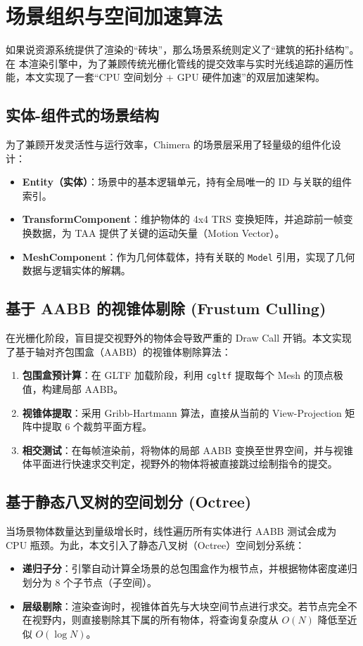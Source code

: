 \section{场景组织与空间加速算法}

如果说资源系统提供了渲染的“砖块”，那么场景系统则定义了“建筑的拓扑结构”。在 本渲染引擎中，为了兼顾传统光栅化管线的提交效率与实时光线追踪的遍历性能，本文实现了一套“CPU 空间划分 + GPU 硬件加速”的双层加速架构。

\subsection{实体-组件式的场景结构}
为了兼顾开发灵活性与运行效率，Chimera 的场景层采用了轻量级的组件化设计：
\begin{itemize}
    \item \textbf{Entity（实体）}：场景中的基本逻辑单元，持有全局唯一的 ID 与关联的组件索引。
    \item \textbf{TransformComponent}：维护物体的 4x4 TRS 变换矩阵，并追踪前一帧变换数据，为 TAA 提供了关键的运动矢量（Motion Vector）。
    \item \textbf{MeshComponent}：作为几何体载体，持有关联的 \texttt{Model} 引用，实现了几何数据与逻辑实体的解耦。
\end{itemize}

\subsection{基于 AABB 的视锥体剔除 (Frustum Culling)}
在光栅化阶段，盲目提交视野外的物体会导致严重的 Draw Call 开销。本文实现了基于轴对齐包围盒（AABB）的视锥体剔除算法：
\begin{enumerate}
    \item \textbf{包围盒预计算}：在 GLTF 加载阶段，利用 \texttt{cgltf} 提取每个 Mesh 的顶点极值，构建局部 AABB。
    \item \textbf{视锥体提取}：采用 Gribb-Hartmann 算法，直接从当前的 View-Projection 矩阵中提取 6 个裁剪平面方程。
    \item \textbf{相交测试}：在每帧渲染前，将物体的局部 AABB 变换至世界空间，并与视锥体平面进行快速求交判定，视野外的物体将被直接跳过绘制指令的提交。
\end{enumerate}

\subsection{基于静态八叉树的空间划分 (Octree)}
当场景物体数量达到量级增长时，线性遍历所有实体进行 AABB 测试会成为 CPU 瓶颈。为此，本文引入了静态八叉树（Octree）空间划分系统：
\begin{itemize}
    \item \textbf{递归子分}：引擎自动计算全场景的总包围盒作为根节点，并根据物体密度递归划分为 8 个子节点（子空间）。
    \item \textbf{层级剔除}：渲染查询时，视锥体首先与大块空间节点进行求交。若节点完全不在视野内，则直接剔除其下属的所有物体，将查询复杂度从 $O(N)$ 降低至近似 $O(\log N)$。
\end{itemize}

